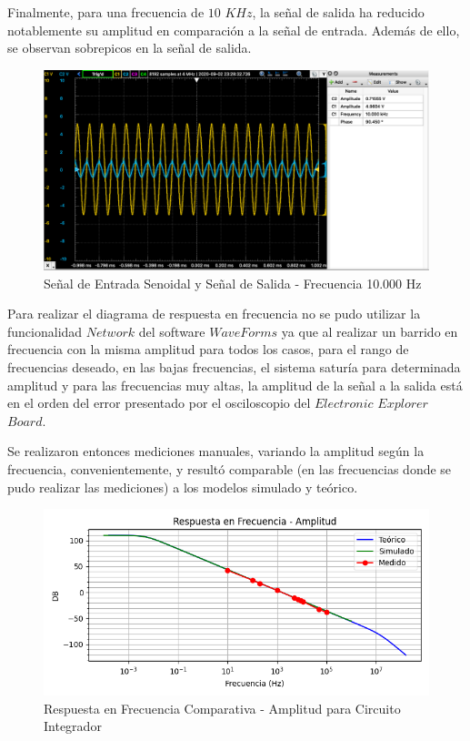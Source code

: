 Finalmente, para una frecuencia de $10$ $KHz$, la señal de salida ha reducido notablemente su amplitud en comparación a la señal de entrada.
Además de ello, se observan sobrepicos en la señal de salida.

\begin{figure}[H]
    \centering 
    \includegraphics [scale=0.4] {../Ejercicio3-CircuitoIntegradoresyDerivadores/Imagenes/senoidal - 10000.png} 
    \caption{Señal de Entrada Senoidal y Señal de Salida - Frecuencia 10.000 Hz}
    \label{fig:emptyPlotTool}
\end{figure}

Para realizar el diagrama de respuesta en frecuencia no se pudo utilizar la funcionalidad $Network$ del software $WaveForms$ ya que al realizar un barrido en frecuencia
con la misma amplitud para todos los casos, para el rango de frecuencias deseado, en las bajas frecuencias, el sistema saturía para determinada amplitud y para las frecuencias muy altas, la amplitud de la señal a la salida
está en el orden del error presentado por el osciloscopio del $Electronic$ $Explorer$ $Board$.

Se realizaron entonces mediciones manuales, variando la amplitud según la frecuencia, convenientemente, y resultó comparable (en las frecuencias donde se pudo realizar las mediciones)
a los modelos simulado y teórico.

\begin{figure}[H]
    \centering 
    \includegraphics [scale=1] {../Ejercicio3-CircuitoIntegradoresyDerivadores/Imagenes/comparativo-integrador-amplitud.png} 
    \caption{Respuesta en Frecuencia Comparativa - Amplitud para Circuito Integrador }
    \label{fig:emptyPlotTool}
\end{figure}

